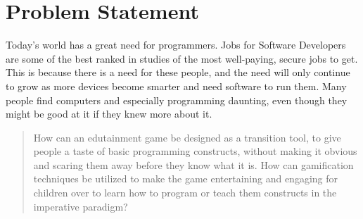 \section{Problem Statement}
\label{sec:problemstatement}

Today's world has a great need for programmers. Jobs for Software Developers are some of the best ranked in studies of the most well-paying, secure jobs to get. This is because there is a need for these people, and the need will only continue to grow as more devices become smarter and need software to run them.
Many people find computers and especially programming daunting, even though they might be good at it if they knew more about it.\newline

\begin{quotation}
	How can an edutainment game be designed as a transition tool, to give people a taste of basic programming constructs, without  making it obvious and scaring them away before they know what it is. How can gamification techniques be utilized to make the game entertaining and engaging for children over  to learn how to program or teach them constructs in the imperative paradigm?
\end{quotation}
